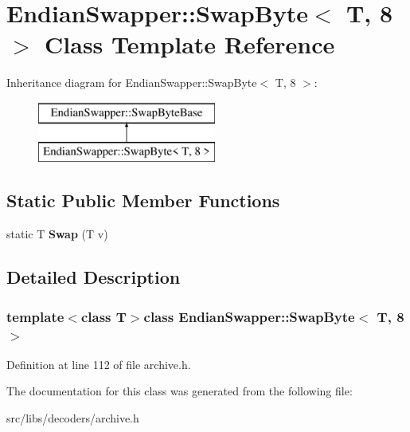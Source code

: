 \hypertarget{classEndianSwapper_1_1SwapByte_3_01T_00_018_01_4}{\section{Endian\-Swapper\-:\-:Swap\-Byte$<$ T, 8 $>$ Class Template Reference}
\label{classEndianSwapper_1_1SwapByte_3_01T_00_018_01_4}
}
Inheritance diagram for Endian\-Swapper\-:\-:Swap\-Byte$<$ T, 8 $>$\-:\begin{figure}[H]
\begin{center}
\leavevmode
\includegraphics[height=2.000000cm]{classEndianSwapper_1_1SwapByte_3_01T_00_018_01_4}
\end{center}
\end{figure}
\subsection*{Static Public Member Functions}
\begin{DoxyCompactItemize}
\item 
\hypertarget{classEndianSwapper_1_1SwapByte_3_01T_00_018_01_4_acc19015487ab16ecbe3e62e9f2c36938}{static T {\bfseries Swap} (T v)}\label{classEndianSwapper_1_1SwapByte_3_01T_00_018_01_4_acc19015487ab16ecbe3e62e9f2c36938}

\end{DoxyCompactItemize}


\subsection{Detailed Description}
\subsubsection*{template$<$class T$>$class Endian\-Swapper\-::\-Swap\-Byte$<$ T, 8 $>$}



Definition at line 112 of file archive.\-h.



The documentation for this class was generated from the following file\-:\begin{DoxyCompactItemize}
\item 
src/libs/decoders/archive.\-h\end{DoxyCompactItemize}
